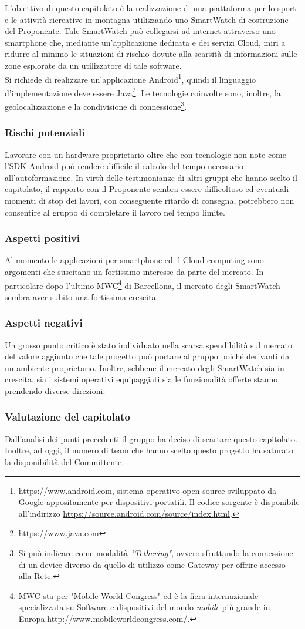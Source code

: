 L'obiettivo di questo capitolato è la realizzazione di una piattaforma per lo sport e le attività ricreative in montagna utilizzando uno SmartWatch di costruzione del Proponente. Tale SmartWatch può collegarsi ad internet attraverso uno smartphone che, mediante un'applicazione dedicata e dei servizi Cloud, miri a ridurre al minimo le situazioni di rischio dovute alla scarsità di informazioni sulle zone esplorate da un utilizzatore di tale software.\\
Si richiede di realizzare un'applicazione Android\footnote{\url{https://www.android.com}, sistema operativo open-source sviluppato da Google appositamente per dispositivi portatili. Il codice sorgente è disponibile all'indirizzo \url{https://source.android.com/source/index.html}.}, quindi il linguaggio d'implementazione deve essere Java\footnote{\url{https://www.java.com}}. Le tecnologie coinvolte sono, inoltre, la geolocalizzazione e la condivisione di connessione\footnote{Si può indicare come modalità \textit{"Tethering"}, ovvero sfruttando la connessione di un device diverso da quello di utilizzo come Gateway per offrire accesso alla Rete.}.
\subsubsection{Rischi potenziali}
Lavorare con un hardware proprietario oltre che con tecnologie non note come l'SDK Android può rendere difficile il calcolo del tempo necessario all’autoformazione.
In virtù delle testimonianze di altri gruppi che hanno scelto il capitolato, il rapporto con il Proponente sembra essere difficoltoso ed eventuali momenti di stop dei lavori, con conseguente ritardo di consegna, potrebbero non consentire al gruppo di completare il lavoro nel tempo limite.
\subsubsection{Aspetti positivi}
Al momento le applicazioni per smartphone ed il Cloud computing sono argomenti che suscitano un fortissimo interesse da parte del mercato. In particolare dopo l'ultimo MWC\footnote{MWC sta per "Mobile World Congress" ed è la fiera internazionale specializzata su Software e dispositivi del mondo \textit{mobile} più grande in Europa.\url{http://www.mobileworldcongress.com/}.} di Barcellona, il mercato degli SmartWatch sembra aver subito una fortissima crescita.
\subsubsection{Aspetti negativi}
Un grosso punto critico è stato individuato nella scarsa spendibilità sul mercato del valore aggiunto che tale progetto può portare al gruppo poiché derivanti da un ambiente proprietario. Inoltre, sebbene il mercato degli SmartWatch sia in crescita, sia i sistemi operativi equipaggiati sia le funzionalità offerte stanno prendendo diverse direzioni.
\subsubsection{Valutazione del capitolato}
Dall'analisi dei punti precedenti il gruppo ha deciso di scartare questo capitolato.
Inoltre, ad oggi, il numero di team che hanno scelto questo progetto ha saturato la disponibilità del Committente.